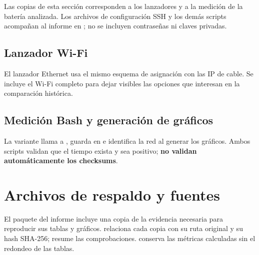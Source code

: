 Las copias de esta sección corresponden a los lanzadores y a la medición de la batería analizada. Los archivos de configuración SSH y los demás scripts acompañan al informe en ; no se incluyen contraseñas ni claves privadas.

\subsection{Lanzador Wi-Fi}
El lanzador Ethernet usa el mismo esquema de asignación con las IP de cable. Se incluye el Wi-Fi completo para dejar visibles las opciones que interesan en la comparación histórica.


\clearpage
\subsection{Medición Bash y generación de gráficos}

La variante  llama a , guarda en  e identifica la red al generar los gráficos. Ambos scripts validan que el tiempo exista y sea positivo; \textbf{no validan automáticamente los checksums}.

\clearpage
\section{Archivos de respaldo y fuentes}

El paquete del informe incluye una copia de la evidencia necesaria para reproducir sus tablas y gráficos.  relaciona cada copia con su ruta original y su hash SHA-256;  resume las comprobaciones.  conserva las métricas calculadas sin el redondeo de las tablas.

